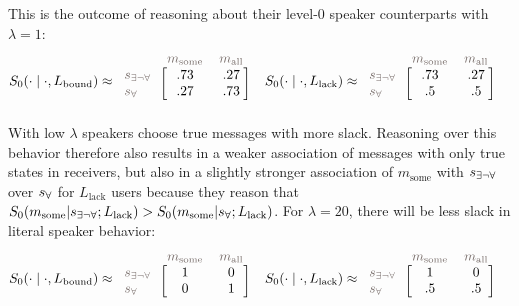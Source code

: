 \documentclass[a4paper, 11pt]{article}
\theoremstyle{Satz}
\newcommand{\state}{\ensuremath{s}\xspace}		%
\newcommand{\mystate}[1]{\ensuremath{\state_{\text{#1}}}\xspace} %
\newcommand{\mylang}[1]{\ensuremath{L_{\text{#1}}}\xspace} %
\newcommand{\messg}{\ensuremath{m}\xspace}		%
\newcommand{\mymessg}[1]{\ensuremath{\messg_{\text{#1}}}\xspace} %
\newcommand{\ssome}{\mystate{\ensuremath{\exists\neg\forall}}}
\newcommand{\sall}{\mystate{\ensuremath{\forall}}}
\newcommand{\msome}{\mymessg{some}}
\newcommand{\mall}{\mymessg{all}}
\newcommand{\Lbound}{\mylang{bound}}
\newcommand{\Llack}{\mylang{lack}}
\newcommand{\mygray}[1]{{\textcolor{mygray}{#1}}}
\begin{document}
This is the outcome of reasoning about their level-$0$ speaker counterparts with $\lambda = 1$:
\begin{align*}
  S_0(\cdot \mid \cdot, \Lbound) & \approx \begin{blockarray}{lcc}
    & \mygray{\msome} & \mygray{\mall} \\
    \begin{block}{l[cc]}
      \mygray{\ssome} & .73 & .27 \\
      \mygray{\sall}  & .27 & .73 \\
    \end{block}
  \end{blockarray} &
  S_0(\cdot \mid \cdot, \Llack) & \approx \begin{blockarray}{lcc}
    & \mygray{\msome} & \mygray{\mall} \\
    \begin{block}{l[cc]}
      \mygray{\ssome} & .73 & .27 \\
      \mygray{\sall}  & .5 & .5 \\
    \end{block}
  \end{blockarray} 
\end{align*}
With low $\lambda$ speakers choose true messages with more slack. Reasoning over this behavior therefore also results in a weaker association of messages with only true states in receivers, but also in a slightly stronger association of $\msome$ with $\ssome$ over $\sall$ for $\Llack$ users because they reason that $S_0(\msome | \ssome;\Llack) > S_0(\msome | \sall;\Llack)$. For $\lambda = 20$, there will be less slack in literal speaker behavior:
\begin{align*}
  S_0(\cdot \mid \cdot, \Lbound) & \approx \begin{blockarray}{lcc}
    & \mygray{\msome} & \mygray{\mall} \\
    \begin{block}{l[cc]}
      \mygray{\ssome} & 1 & 0 \\
      \mygray{\sall}  & 0 & 1 \\
    \end{block}
  \end{blockarray} &
  S_0(\cdot \mid \cdot, \Llack) & \approx \begin{blockarray}{lcc}
    & \mygray{\msome} & \mygray{\mall} \\
    \begin{block}{l[cc]}
      \mygray{\ssome} &  1 & 0 \\
      \mygray{\sall}  & .5 & .5 \\
    \end{block}
  \end{blockarray} 
\end{align*}
\end{document}
